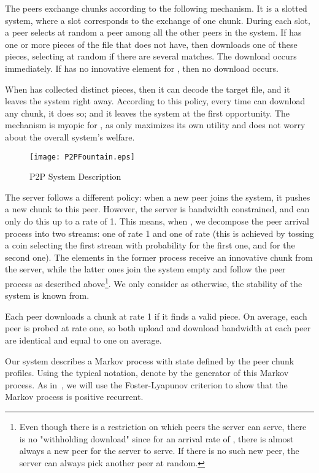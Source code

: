 \documentclass[11pt,conference]{IEEEtran}
\begin{document}
The peers exchange chunks according to the following mechanism. It is a slotted system, where a slot corresponds to the exchange of one chunk. During each slot, a peer  selects at random a peer  among all the other peers in the system. If  has one or more pieces of the file that  does not have, then  downloads one of these pieces, selecting at random if there are several matches. The download occurs immediately. If  has no innovative element for , then no download occurs.

When  has collected  distinct pieces, then it can decode the target file, and it leaves the system right away. According to this policy, every time  can download any chunk, it does so; and it leaves the system at the first opportunity. The mechanism is myopic for , as  only maximizes its own utility and does not worry about the overall system's welfare.

\begin{figure}[!t]
\centering
\texttt{[image: P2PFountain.eps]}
\caption{P2P System Description}
\label{fig:p2pfountain}
\end{figure}

The server follows a different policy: when a new peer joins the system, it pushes a new chunk to this peer. However, the server is bandwidth constrained, and can only do this up to a rate of 1. This means, when , we decompose the peer arrival process into two streams: one of rate 1 and one of rate  (this is achieved by tossing a coin selecting the first stream with probability  for the first one, and  for the second one). The elements in the former process receive an innovative chunk from the server, while the latter ones join the system empty and follow the peer process as described above\footnote{Even though there is a restriction on which peers the server can serve, there is no "withholding download" since for an arrival rate of , there is almost always a new peer for the server to serve. If there is no such new peer, the server can always pick another peer at random.}. We only consider  as otherwise, the stability of the system is known from\cite{Zhu2011Stability}.

Each peer downloads a chunk at rate 1 if it finds a valid piece. On average, each peer is probed at rate one, so both upload and download bandwidth at each peer are identical and equal to one on average.

Our system describes a Markov process with state defined by the peer chunk profiles. Using the typical notation, denote by  the generator of this Markov process. As in~\cite{Zhu2011Stability}\cite{Oguz:EECS-2012-6}, we will use the Foster-Lyapunov criterion to show that the Markov process is positive recurrent.
\end{document}
